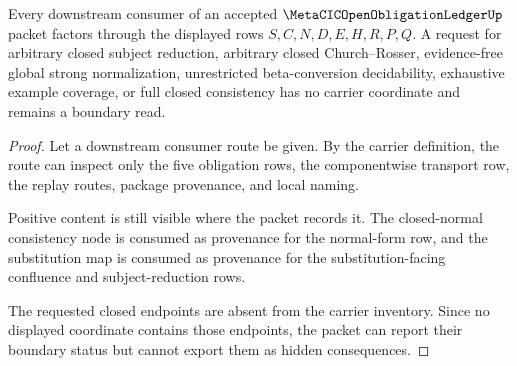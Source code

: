 \begin{theorem}
\label{thm:metacic-open-obligation-ledger-nonescape}
Every downstream consumer of an accepted $\MetaCICOpenObligationLedgerUp$ packet factors through the displayed rows $S,C,N,D,E,H,R,P,Q$. A request for arbitrary closed subject reduction, arbitrary closed Church--Rosser, evidence-free global strong normalization, unrestricted beta-conversion decidability, exhaustive example coverage, or full closed consistency has no carrier coordinate and remains a boundary read.
\end{theorem}
\begin{proof}
Let a downstream consumer route be given. By the carrier definition, the route can inspect only the five obligation rows, the componentwise transport row, the replay routes, package provenance, and local naming.

Positive content is still visible where the packet records it. The closed-normal consistency node is consumed as provenance for the normal-form row, and the substitution map is consumed as provenance for the substitution-facing confluence and subject-reduction rows.

The requested closed endpoints are absent from the carrier inventory. Since no displayed coordinate contains those endpoints, the packet can report their boundary status but cannot export them as hidden consequences.
\end{proof}


\begin{closurestatus}{\MetaCICOpenObligationLedgerUp}
  \theoryclosure{\seedClosure}
  \formalstatus{\unformalizedV}
\end{closurestatus}
